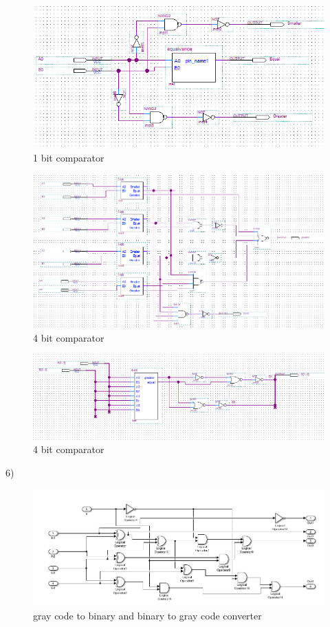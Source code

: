 \documentclass[11pt]{report}
\begin{document}
\begin{figure}[H]
  \includegraphics[width=\linewidth]{1bit}
  \caption{1 bit comparator}
  \label{fig:zero}
\end{figure} 

\begin{figure}[H]
  \includegraphics[width=\linewidth]{4bit1}
  \caption{4 bit comparator}
  \label{fig:zero}
\end{figure} 

\begin{figure}[H]
  \includegraphics[width=\linewidth]{4bit}
  \caption{4 bit comparator}
  \label{fig:zero}
\end{figure} 

6)
\begin{figure}[H]
  \includegraphics[width=\linewidth]{xor}
  \caption{gray code to binary and binary to gray code converter}
  \label{fig:zero}
\end{figure} 
\end{document}
